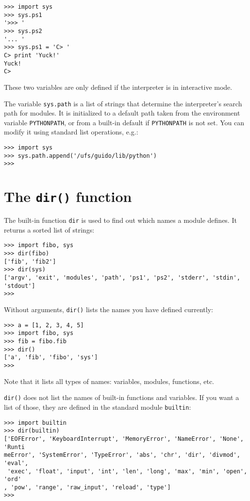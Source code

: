 \bcode\begin{verbatim}
>>> import sys
>>> sys.ps1
'>>> '
>>> sys.ps2
'... '
>>> sys.ps1 = 'C> '
C> print 'Yuck!'
Yuck!
C> 
\end{verbatim}\ecode
%
These two variables are only defined if the interpreter is in
interactive mode.

The variable
{\tt sys.path}
is a list of strings that determine the interpreter's search path for
modules.
It is initialized to a default path taken from the environment variable
{\tt PYTHONPATH},
or from a built-in default if
{\tt PYTHONPATH}
is not set.
You can modify it using standard list operations, e.g.:

\bcode\begin{verbatim}
>>> import sys
>>> sys.path.append('/ufs/guido/lib/python')
>>> 
\end{verbatim}\ecode

\section{The {\tt dir()} function}

The built-in function {\tt dir} is used to find out which names a module
defines.  It returns a sorted list of strings:

\bcode\begin{verbatim}
>>> import fibo, sys
>>> dir(fibo)
['fib', 'fib2']
>>> dir(sys)
['argv', 'exit', 'modules', 'path', 'ps1', 'ps2', 'stderr', 'stdin', 'stdout']
>>>
\end{verbatim}\ecode
%
Without arguments, {\tt dir()} lists the names you have defined currently:

\bcode\begin{verbatim}
>>> a = [1, 2, 3, 4, 5]
>>> import fibo, sys
>>> fib = fibo.fib
>>> dir()
['a', 'fib', 'fibo', 'sys']
>>>
\end{verbatim}\ecode
%
Note that it lists all types of names: variables, modules, functions, etc.

{\tt dir()} does not list the names of built-in functions and variables.
If you want a list of those, they are defined in the standard module
{\tt builtin}:

\bcode\begin{verbatim}
>>> import builtin
>>> dir(builtin)
['EOFError', 'KeyboardInterrupt', 'MemoryError', 'NameError', 'None', 'Runti
meError', 'SystemError', 'TypeError', 'abs', 'chr', 'dir', 'divmod', 'eval',
 'exec', 'float', 'input', 'int', 'len', 'long', 'max', 'min', 'open', 'ord'
, 'pow', 'range', 'raw_input', 'reload', 'type']
>>>
\end{verbatim}\ecode


